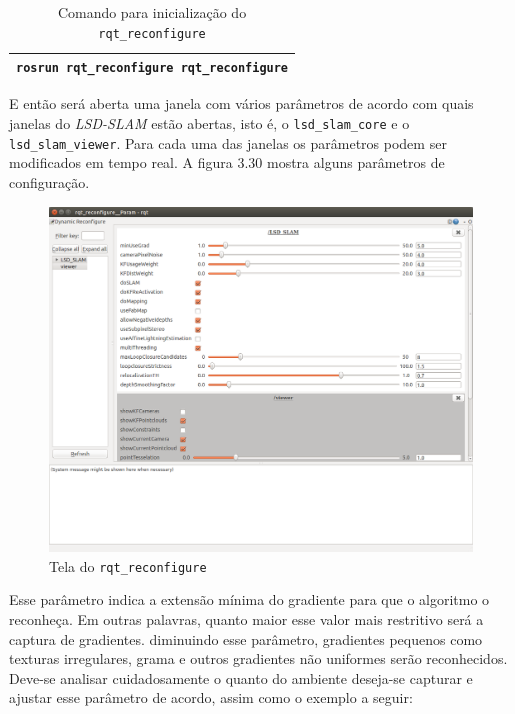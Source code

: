 \begin{table}[!ht]\label{tb:16}
\begin{tabular}{| p{\textwidth}|}
\hline
\texttt{rosrun rqt\_reconfigure rqt\_reconfigure}\\
\hline
\end{tabular}
\caption{Comando para inicialização do \texttt{rqt\_reconfigure}}
\end{table}

E então será aberta uma janela com vários parâmetros de acordo com quais janelas do \textit{LSD-SLAM} estão abertas, isto é, o \texttt{lsd\_slam\_core} e o \texttt{lsd\_slam\_viewer}. Para cada uma das janelas os parâmetros podem ser modificados em tempo real. A figura 3.30 mostra alguns parâmetros de configuração.

\begin{figure}[!htb]
	\centering
		\includegraphics[width= \textwidth]{Imagens/figura3-30.png}
	\caption{Tela do \texttt{rqt\_reconfigure}}
	\label{fig3:28}
\end{figure}




Esse parâmetro indica a extensão mínima do gradiente para que o algoritmo o reconheça. Em outras palavras, quanto maior esse valor mais restritivo será a captura de gradientes. diminuindo esse parâmetro, gradientes pequenos como texturas irregulares, grama e outros gradientes não uniformes serão reconhecidos. Deve-se analisar cuidadosamente o quanto do ambiente deseja-se capturar e ajustar esse parâmetro de acordo, assim como o exemplo a seguir:

